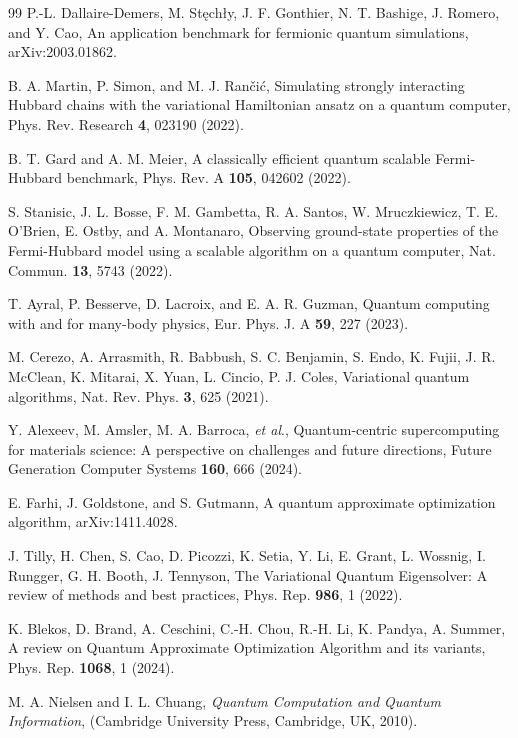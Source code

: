 \documentclass[twocolumn,superscriptaddress,amsmath,amssymb,showpacs,floatfix,preprintnumbers]{revtex4-1}
\begin{document}
\begin{thebibliography}{99}
P.-L. Dallaire-Demers, M. St\k{e}ch\l{}y, J. F. Gonthier, N. T. Bashige, J. Romero, and Y. Cao, 
An application benchmark for fermionic quantum simulations,
arXiv:2003.01862.

B. A. Martin, P. Simon, and M. J. Ran\v{c}i\'{c},
Simulating strongly interacting Hubbard chains with the variational Hamiltonian ansatz on a quantum computer,
Phys. Rev. Research \textbf{4}, 023190 (2022). 

B. T. Gard and A. M. Meier,
A classically efficient quantum scalable Fermi-Hubbard benchmark,
Phys. Rev. A \textbf{105}, 042602 (2022). 

S. Stanisic, J. L. Bosse, F. M. Gambetta, R. A. Santos, W. Mruczkiewicz, T. E. O'Brien, E. Ostby,
and A. Montanaro,
Observing ground-state properties of the Fermi-Hubbard model using a scalable algorithm on 
a quantum computer,
Nat. Commun. \textbf{13}, 5743 (2022).

T. Ayral, P. Besserve, D. Lacroix, and E. A. R. Guzman, 
Quantum computing with and for many-body physics,
Eur. Phys. J. A \textbf{59}, 227 (2023).

M. Cerezo, A. Arrasmith, R. Babbush, S. C. Benjamin, S. Endo, K. Fujii, J. R. McClean, K. Mitarai,
X. Yuan, L. Cincio, P. J. Coles,
Variational quantum algorithms,
Nat. Rev. Phys. \textbf{3}, 625 (2021).

Y. Alexeev, M. Amsler, M. A. Barroca, \textit{et al}., 
Quantum-centric supercomputing for materials science: A perspective on challenges and future directions, 
Future Generation Computer Systems \textbf{160}, 666 (2024).

E. Farhi, J. Goldstone, and S. Gutmann,
A quantum approximate optimization algorithm, 
arXiv:1411.4028.

J. Tilly, H. Chen, S. Cao, D. Picozzi, K. Setia, Y. Li, E. Grant, L. Wossnig, I. Rungger, 
G. H. Booth, J. Tennyson,
The Variational Quantum Eigensolver: A review of methods and best practices,
Phys. Rep. \textbf{986}, 1 (2022).

K. Blekos, D. Brand, A. Ceschini, C.-H. Chou, R.-H. Li, K. Pandya, A. Summer,
A review on Quantum Approximate Optimization Algorithm and its variants,
Phys. Rep. \textbf{1068}, 1 (2024).

M. A. Nielsen and I. L. Chuang, 
\textit{Quantum Computation and Quantum Information},
(Cambridge University Press, Cambridge, UK, 2010).


\end{thebibliography}
\end{document}
